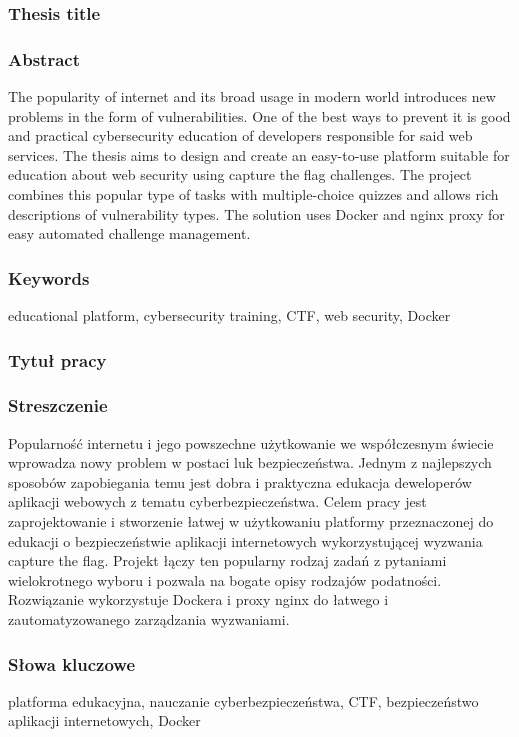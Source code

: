 \subsubsection*{Thesis title} \Title

\subsubsection*{Abstract}
The popularity of internet and its broad usage in modern world introduces new problems in the form of vulnerabilities. One of the best ways to prevent it is good and practical cybersecurity education of developers responsible for said web services. The thesis aims to design and create an easy-to-use platform suitable for education about web security using capture the flag challenges. The project combines this popular type of tasks with multiple-choice quizzes and allows rich descriptions of vulnerability types. The solution uses Docker and nginx proxy for easy automated challenge management.

\subsubsection*{Keywords}
educational platform, cybersecurity training, CTF, web security, Docker

\subsubsection*{Tytuł pracy}
\begin{otherlanguage}{polish}
\TitleAlt
\end{otherlanguage}

\subsubsection*{Streszczenie}
\begin{otherlanguage}{polish}
Popularność internetu i jego powszechne użytkowanie we współczesnym świecie wprowadza nowy problem w postaci luk bezpieczeństwa. Jednym z najlepszych sposobów zapobiegania temu jest dobra i praktyczna edukacja deweloperów aplikacji webowych z tematu cyberbezpieczeństwa. Celem pracy jest zaprojektowanie i stworzenie łatwej w użytkowaniu platformy przeznaczonej do edukacji o bezpieczeństwie aplikacji internetowych wykorzystującej wyzwania capture the flag. Projekt łączy ten popularny rodzaj zadań z pytaniami wielokrotnego wyboru i pozwala na bogate opisy rodzajów podatności. Rozwiązanie wykorzystuje Dockera i proxy nginx do łatwego i zautomatyzowanego zarządzania wyzwaniami.
\end{otherlanguage}
\subsubsection*{Słowa kluczowe}
\begin{otherlanguage}{polish}
platforma edukacyjna, nauczanie cyberbezpieczeństwa, CTF, bezpieczeństwo aplikacji internetowych, Docker
\end{otherlanguage}

